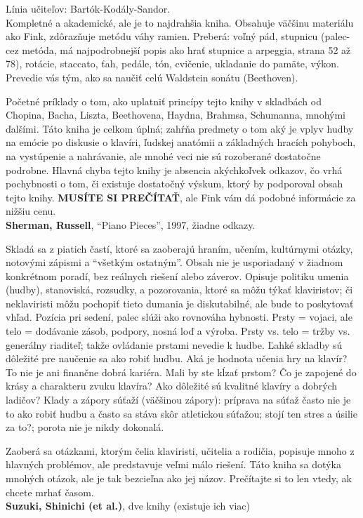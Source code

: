 \documentclass[11pt,a4paper]{book}
\begin{document}
Línia učiteľov: Bartók-Kodály-Sandor.\\
Kompletné a akademické, ale je to najdrahšia kniha. Obsahuje väčšinu materiálu ako Fink, zdôrazňuje metódu váhy ramien. Preberá: voľný pád, stupnicu (palec-cez metóda, má najpodrobnejší popis ako hrať stupnice a arpeggia, strana 52 až 78), rotácie, staccato, ťah, pedále, tón, cvičenie, ukladanie do pamäte, výkon. Prevedie vás tým, ako sa naučiť celú Waldstein sonátu (Beethoven). 

Početné príklady o tom, ako uplatniť princípy tejto knihy v skladbách od Chopina, Bacha, Liszta, Beethovena, Haydna, Brahmsa, Schumanna, mnohými ďalšími. Táto kniha je celkom úplná; zahŕňa predmety o tom aký je vplyv hudby na emócie po diskusie o klavíri, ľudskej anatómii a základných hracích pohyboch, na vystúpenie a nahrávanie, ale mnohé veci nie sú rozoberané dostatočne podrobne. Hlavná chyba tejto knihy je absencia akýchkoľvek odkazov, čo vrhá pochybnosti o tom, či existuje dostatočný  výskum, ktorý by podporoval obsah tejto knihy. \textbf{MUSÍTE SI PREČÍTAŤ}, ale Fink vám dá podobné informácie za nižšiu cenu.
\medskip\\
\textbf{Sherman, Russell}, “Piano Pieces”, 1997, žiadne odkazy.

Skladá sa z piatich častí, ktoré sa zaoberajú hraním, učením, kultúrnymi otázky, notovými zápismi a “všetkým ostatným”. Obsah nie je usporiadaný v žiadnom konkrétnom poradí, bez reálnych riešení alebo záverov. Opisuje politiku umenia (hudby), stanoviská, rozsudky, a pozorovania, ktoré sa môžu týkať klaviristov; či neklaviristi môžu pochopiť tieto dumania je diskutabilné, ale bude to poskytovať vhľad. Pozícia pri sedení, palec slúži ako rovnováha hybnosti. Prsty = vojaci, ale telo = dodávanie zásob, podpory, nosná loď a výroba. Prsty vs. telo = tržby vs. generálny riaditeľ; takže ovládanie prstami nevedie k hudbe. Ľahké skladby sú dôležité pre naučenie sa ako robiť hudbu. Aká je hodnota učenia hry na klavír? To nie je ani finančne dobrá kariéra. Mali by ste kĺzať prstom? Čo je zapojené do krásy a charakteru zvuku klavíra? Ako dôležité sú kvalitné klavíry a dobrých ladičov? Klady a zápory súťaží (väčšinou zápory): príprava na súťaž často nie je to ako robiť hudbu a často sa stáva skôr atletickou súťažou; stojí ten stres a úsilie za to?; porota  nie je nikdy dokonalá. 

Zaoberá sa otázkami, ktorým čelia klaviristi, učitelia a rodičia, popisuje mnoho z hlavných problémov, ale predstavuje veľmi málo riešení. Táto kniha sa dotýka mnohých otázok, ale je tak bezcieľna ako jej názov. Prečítajte si to len vtedy, ak chcete mrhať časom. 
\medskip\\
\textbf{Suzuki, Shinichi (et al.)}, dve knihy (existuje ich viac)
\end{document}

